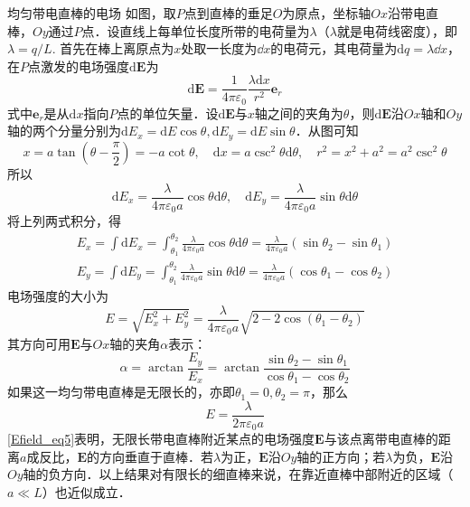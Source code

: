\begin{example}{均匀带电直棒的电场}
如图，取$P $点到直棒的垂足$O$为原点，坐标轴$Ox $沿带电直棒，$ Oy $通过$P $点．设直线上每单位长度所带的电荷量为$\lambda$（$\lambda$就是电荷线密度），即$\lambda=q/L$. 首先在棒上离原点为$x $处取一长度为$\dd{x}$的电荷元，其电荷量为$\mathrm dq=\lambda\dd{x}$，在$P $点激发的电场强度$\mathrm d\mathbf E$为
\begin{equation}
\mathrm{d} \mathbf{E}=\frac{1}{4 \pi \varepsilon_{0}} \frac{\lambda \mathrm{d} x}{r^{2}} \mathbf e_r
\end{equation}
式中$\mathbf e_r$是从$\mathrm dx$指向$P $点的单位矢量．设$\mathrm{d} \mathbf{E}$与$x$轴之间的夹角为$\theta$，则$\mathrm{d} \mathbf{E}$沿$Ox$轴和$Oy$轴的两个分量分别为$\mathrm{d} E_{x}=\mathrm{d} E \cos \theta, \mathrm{d} E_{y}=\mathrm{d} E \sin \theta$．从图可知
\begin{equation}
x=a \tan \left(\theta-\frac{\pi}{2}\right)=-a \cot \theta, \quad \mathrm{d} x=a \csc ^{2} \theta \mathrm{d} \theta, \quad r^{2}=x^{2}+a^{2}=a^{2} \csc ^{2} \theta
\end{equation}
所以
\begin{equation}
\mathrm{d} E_{x}=\frac{\lambda}{4 \pi \varepsilon_{0} a} \cos \theta \mathrm{d} \theta, \quad \mathrm{d} E_{y}=\frac{\lambda}{4 \pi \varepsilon_{0} a} \sin \theta \mathrm{d} \theta
\end{equation}
将上列两式积分，得
\begin{equation}
\begin{aligned}E_{x}=\int \mathrm{d} E_{x}=\int_{\theta_{1}}^{\theta_{2}} \frac{\lambda}{4 \pi \varepsilon_{0} a} \cos \theta \mathrm{d} \theta=\frac{\lambda}{4 \pi \varepsilon_{0} a}\left(\sin \theta_{2}-\sin \theta_{1}\right) \\ E_{y}=\int \mathrm{d} E_{y}=\int_{\theta_{1}}^{\theta_{2}} \frac{\lambda}{4 \pi \varepsilon_{0} a} \sin \theta \mathrm{d} \theta=\frac{\lambda}{4 \pi \varepsilon_{0} a}\left(\cos \theta_{1}-\cos \theta_{2}\right)\end{aligned}
\end{equation}
电场强度的大小为
\begin{equation}
E=\sqrt{E_{x}^{2}+E_{y}^{2}}=\frac{\lambda}{4 \pi \varepsilon_{0} a} \sqrt{2-2 \cos \left(\theta_{1}-\theta_{2}\right)}
\end{equation}
其方向可用$\mathbf E$与$Ox $轴的夹角$\alpha$表示：
\begin{equation}
\alpha=\arctan \frac{E_{y}}{E_{x}}=\arctan \frac{\sin \theta_{2}-\sin \theta_{1}}{\cos \theta_{1}-\cos \theta_{2}}
\end{equation}
如果这一均匀带电直棒是无限长的，亦即$\theta_{1}=0, \theta_{2}=\pi$，那么
\begin{equation} \label{Efield_eq5}
E=\frac{\lambda}{2 \pi \varepsilon_{0} a}
\end{equation}
\autoref{Efield_eq5}表明，无限长带电直棒附近某点的电场强度$\mathbf E $与该点离带电直棒的距离$a $成反比，$\mathbf  E $的方向垂直于直棒．若$\lambda$为正，$\mathbf E $沿$Oy $轴的正方向；若$\lambda$为负，$\mathbf E $沿$Oy $轴的负方向．以上结果对有限长的细直棒来说，在靠近直棒中部附近的区域（$a\ll L$）也近似成立．
\end{example}


